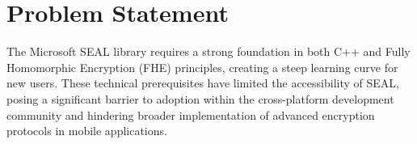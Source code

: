 \section{Problem Statement}
The Microsoft SEAL library requires a strong foundation in both C++ and Fully Homomorphic Encryption (FHE) principles, creating a steep learning curve for new users. These technical prerequisites have limited the accessibility of SEAL, posing a significant barrier to adoption within the cross-platform development community and hindering broader implementation of advanced encryption protocols in mobile applications.
